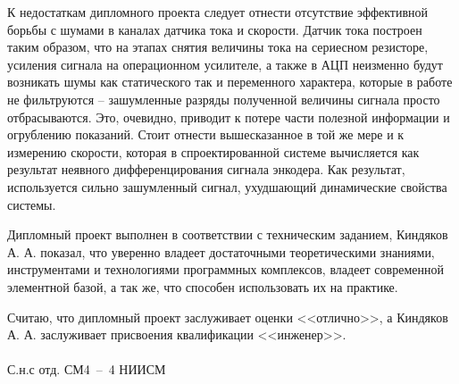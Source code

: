 \documentclass[a4paper, 11pt]{article}
\newcommand\studentname{Киндяков А. А. }
\begin{document}
К недостаткам дипломного проекта следует отнести отсутствие эффективной
борьбы с шумами в каналах датчика тока и скорости. Датчик тока построен таким
образом, что на этапах снятия величины тока на сериесном резисторе,
усиления сигнала на операционном усилителе, а также в АЦП неизменно будут
возникать шумы как статического так и переменного характера, которые в работе
не фильтруются -- зашумленные разряды полученной величины сигнала просто отбрасываются.
Это, очевидно, приводит к потере части полезной информации и огрублению показаний.
Стоит отнести вышесказанное в той же мере и к измерению скорости, которая в
спроектированной системе вычисляется как результат неявного дифференцирования
сигнала энкодера. Как результат, используется сильно зашумленный сигнал,
ухудшающий динамические свойства системы.

Дипломный проект выполнен в соответствии с техническим заданием, \studentname
показал, что уверенно владеет достаточными теоретическими знаниями, инструментами
и технологиями программных комплексов, владеет современной элементной базой,
а так же, что способен использовать их на практике.

Считаю, что дипломный проект заслуживает оценки <<отлично>>, а \studentname
заслуживает присвоения квалификации <<инженер>>.

\paragraph{ }
С.н.с отд. СМ4~--~4 НИИСМ
\end{document}
